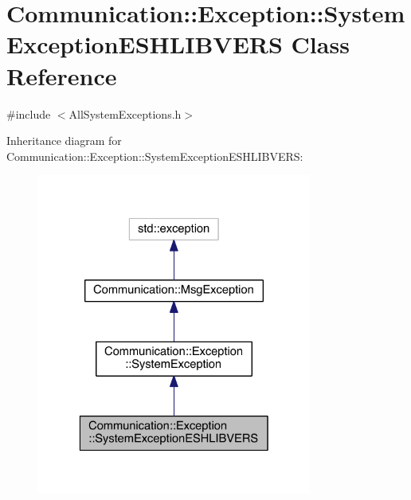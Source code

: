 \hypertarget{class_communication_1_1_exception_1_1_system_exception_e_s_h_l_i_b_v_e_r_s}{}\section{Communication\+:\+:Exception\+:\+:System\+Exception\+E\+S\+H\+L\+I\+B\+V\+E\+R\+S Class Reference}
\label{class_communication_1_1_exception_1_1_system_exception_e_s_h_l_i_b_v_e_r_s}


{\ttfamily \#include $<$All\+System\+Exceptions.\+h$>$}



Inheritance diagram for Communication\+:\+:Exception\+:\+:System\+Exception\+E\+S\+H\+L\+I\+B\+V\+E\+R\+S\+:\nopagebreak
\begin{figure}[H]
\begin{center}
\leavevmode
\includegraphics[width=256pt]{class_communication_1_1_exception_1_1_system_exception_e_s_h_l_i_b_v_e_r_s__inherit__graph}
\end{center}
\end{figure}


